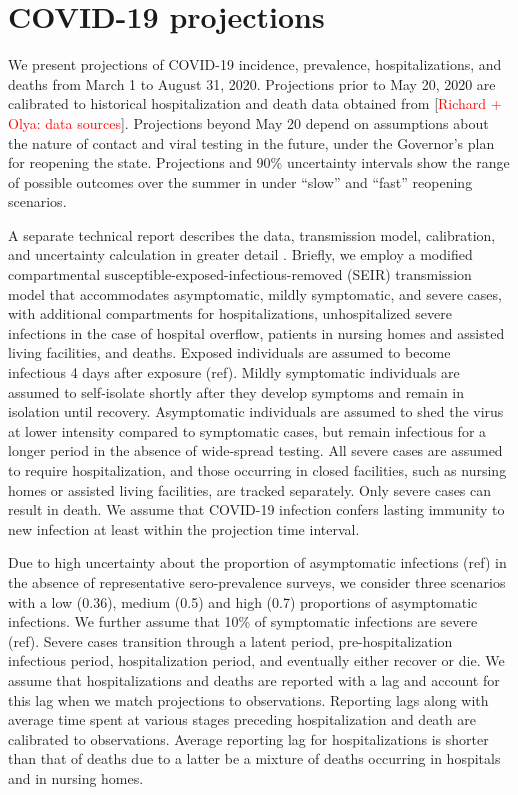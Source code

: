 \documentclass[11pt]{article}
\newcommand{\comment}[1]{[\textcolor{red}{#1}]}
\begin{document}

\section*{COVID-19 projections} 

We present projections of COVID-19 incidence, prevalence, hospitalizations, and deaths from March 1 to August 31, 2020.  Projections prior to May 20, 2020 are calibrated to historical hospitalization and death data obtained from \comment{Richard + Olya: data sources}.  Projections beyond May 20 depend on assumptions about the nature of contact and viral testing in the future, under the Governor's plan for reopening the state.  Projections and 90\% uncertainty intervals show the range of possible outcomes over the summer in under ``slow'' and ``fast'' reopening scenarios.  

A separate technical report describes the data, transmission model, calibration, and uncertainty calculation in greater detail \citep{morozova2020tech}.  Briefly, we employ a modified compartmental susceptible-exposed-infectious-removed (SEIR) transmission model that accommodates asymptomatic, mildly symptomatic, and severe cases, with additional compartments for hospitalizations, unhospitalized severe infections in the case of hospital overflow, patients in nursing homes and assisted living facilities, and deaths. 
Exposed individuals are assumed to become infectious 4 days after exposure (ref). Mildly symptomatic individuals are assumed to self-isolate shortly after they develop symptoms and remain in isolation until recovery. Asymptomatic individuals are assumed to shed the virus at lower intensity compared to symptomatic cases, but remain infectious for a longer period in the absence of wide-spread testing. All severe cases are assumed to require hospitalization, and those occurring in closed facilities, such as nursing homes or assisted living facilities, are tracked separately. Only severe cases can result in death.  We assume that COVID-19 infection confers lasting immunity to new infection at least within the projection time interval.  

Due to high uncertainty about the proportion of asymptomatic infections (ref) in the absence of representative sero-prevalence surveys, we consider three scenarios with a low (0.36), medium (0.5) and high (0.7) proportions of asymptomatic infections. We further assume that 10\% of symptomatic infections are severe (ref). Severe cases transition through a latent period, pre-hospitalization infectious period, hospitalization period, and eventually either recover or die. We assume that hospitalizations and deaths are reported with a lag and account for this lag when we match projections to observations. Reporting lags along with average time spent at various stages preceding hospitalization and death are calibrated to observations. Average reporting lag for hospitalizations is shorter than that of deaths due to a latter be a mixture of deaths occurring in hospitals and in nursing homes.  
\end{document}
